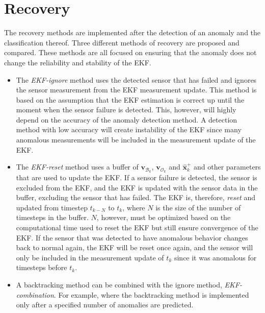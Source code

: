 \chapter{Recovery}
\label{chap:Recovery}
The recovery methods are implemented after the detection of an anomaly and the classification thereof. Three different methods of recovery are proposed and compared. These methods are all focused on ensuring that the anomaly does not change the reliability and stability of the EKF.

\begin{itemize}
	\item The \emph{EKF-ignore} method uses the detected sensor that has failed and ignores the sensor measurement from the EKF measurement update. This method is based on the assumption that the EKF estimation is correct up until the moment when the sensor failure is detected. This, however, will highly depend on the accuracy of the anomaly detection method. A detection method with low accuracy will create instability of the EKF since many anomalous measurements will be included in the measurement update of the EKF.
	
	\item The \emph{EKF-reset} method uses a buffer of $\mathbf{v}_{\mathcal{B}_k}$, $\mathbf{v}_{\mathcal{O}_k}$ and $\hat{\mathbf{x}}_k^+$ and other parameters that are used to update the EKF. If a sensor failure is detected, the sensor is excluded from the EKF, and the EKF is updated with the sensor data in the buffer, excluding the sensor that has failed. The EKF is, therefore, \emph{reset} and updated from timestep $t_{k-N}$ to $t_k$, where $N$ is the size of the number of timesteps in the buffer. $N$, however, must be optimized based on the computational time used to reset the EKF but still ensure convergence of the EKF. If the sensor that was detected to have anomalous behavior changes back to normal again, the EKF will be reset once again, and the sensor will only be included in the measurement update of $t_k$ since it was anomalous for timesteps before $t_k$.
	
	\item A backtracking method can be combined with the ignore method, \emph{EKF-combination}. For example, where the backtracking method is implemented only after a specified number of anomalies are predicted.
	

\end{itemize}
